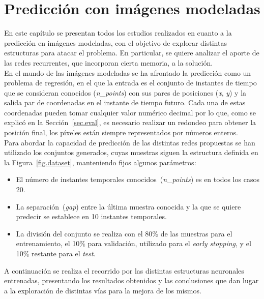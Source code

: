 \chapter{Predicción con imágenes modeladas}\label{cap.redes3dmod}

En este capítulo se presentan todos los estudios realizados en cuanto a la predicción en imágenes modeladas, con el objetivo de explorar distintas estructuras para atacar el problema. En particular, se quiere analizar el aporte de las redes recurrentes, que incorporan cierta memoria, a la solución.\\

En el mundo de las imágenes modeladas se ha afrontado la predicción como un problema de regresión, en el que la entrada es el conjunto de instantes de tiempo que se consideran conocidos (\textit{n}\_\textit{points}) con sus pares de posiciones (\textit{x}, \textit{y}) y la salida par de coordenadas en el instante de tiempo futuro. Cada una de estas coordenadas pueden tomar cualquier valor numérico decimal por lo que, como se explicó en la Sección~\ref{sec.eval}, es necesario realizar un redondeo para obtener la posición final, los píxeles están siempre representados por números enteros.\\

Para abordar la capacidad de predicción de las distintas redes propuestas se han utilizado los conjuntos generados, cuyas muestras siguen la estructura definida en la Figura~\ref{fig.dataset}, manteniendo fijos algunos parámetros:
\begin{itemize}
    \item El número de instantes temporales conocidos~(\textit{n}\_\textit{points}) es en todos los casos 20.
    \item La separación~(\textit{gap}) entre la última muestra conocida y la que se quiere predecir se establece en 10 instantes temporales.
    \item La división del conjunto se realiza con el 80\% de las muestras para el entrenamiento, el 10\% para validación, utilizado para el \textit{early stopping}, y el 10\% restante para el \textit{test}.
\end{itemize}

A continuación se realiza el recorrido por las distintas estructuras neuronales entrenadas, presentando los resultados obtenidos y las conclusiones que dan lugar a la exploración de distintas vías para la mejora de los mismos.

